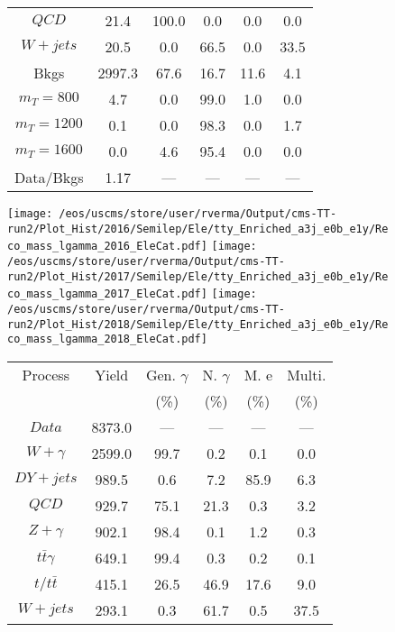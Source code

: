 \begin{figure}
\begin{minipage}[c]{0.32\textwidth}
{\begin{tabular}{cccccc}
$ QCD $ &  21.4 &  100.0 &  0.0 &  0.0 &  0.0\\
$ W+jets $ &  20.5 &  0.0 &  66.5 &  0.0 &  33.5\\
Bkgs &  2997.3 &  67.6 &  16.7 &  11.6 &  4.1\\
$ m_{T} = 800 $ &  4.7 &  0.0 &  99.0 &  1.0 &  0.0\\
$ m_{T} = 1200 $ &  0.1 &  0.0 &  98.3 &  0.0 &  1.7\\
$ m_{T} = 1600 $ &  0.0 &  4.6 &  95.4 &  0.0 &  0.0\\
Data/Bkgs &  1.17 &  --- &  --- &  --- &  ---\\
\hline
\end{tabular}
}
\end{minipage}
\end{figure}

\begin{figure}
\centering
\texttt{[image: /eos/uscms/store/user/rverma/Output/cms-TT-run2/Plot\_Hist/2016/Semilep/Ele/tty\_Enriched\_a3j\_e0b\_e1y/Reco\_mass\_lgamma\_2016\_EleCat.pdf]}
\texttt{[image: /eos/uscms/store/user/rverma/Output/cms-TT-run2/Plot\_Hist/2017/Semilep/Ele/tty\_Enriched\_a3j\_e0b\_e1y/Reco\_mass\_lgamma\_2017\_EleCat.pdf]}
\texttt{[image: /eos/uscms/store/user/rverma/Output/cms-TT-run2/Plot\_Hist/2018/Semilep/Ele/tty\_Enriched\_a3j\_e0b\_e1y/Reco\_mass\_lgamma\_2018\_EleCat.pdf]}
\begin{minipage}[c]{0.32\textwidth}
\centering
\tiny{
\begin{tabular}{cccccc}
\hline
Process & Yield & Gen. $\gamma$ & N. $\gamma$ & M. e & Multi. \\
 &  & (\%) & (\%) & (\%) & (\%)  \\
\hline
                                                                      $ Data $ &  8373.0 &  --- &  --- &  --- &  ---\\
$ W+\gamma $ &  2599.0 &  99.7 &  0.2 &  0.1 &  0.0\\
$ DY+jets $ &  989.5 &  0.6 &  7.2 &  85.9 &  6.3\\
$ QCD $ &  929.7 &  75.1 &  21.3 &  0.3 &  3.2\\
$ Z+\gamma $ &  902.1 &  98.4 &  0.1 &  1.2 &  0.3\\
$ t\bar{t}\gamma $ &  649.1 &  99.4 &  0.3 &  0.2 &  0.1\\
$ t/t\bar{t} $ &  415.1 &  26.5 &  46.9 &  17.6 &  9.0\\
$ W+jets $ &  293.1 &  0.3 &  61.7 &  0.5 &  37.5\\

\end{tabular}}
\end{minipage}
\end{figure}
